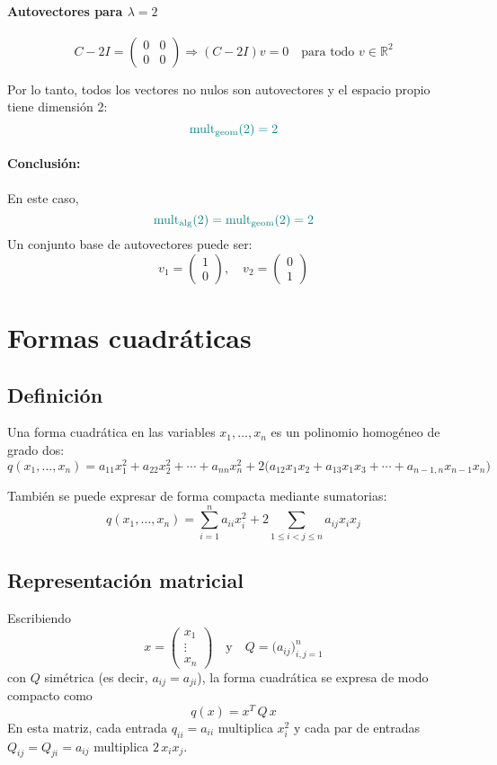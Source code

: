 \documentclass{article}
\begin{document}
\paragraph*{Autovectores para \(\lambda=2\)}

\[
C - 2I = \begin{pmatrix}
0 & 0\\
0 & 0
\end{pmatrix}
\Rightarrow
(C - 2I)v = 0 \quad \text{para todo } v\in\mathbb{R}^2
\]

Por lo tanto, todos los vectores no nulos son autovectores y el espacio propio tiene dimensión 2:
\[
\color{teal}
\mathrm{mult}_{\mathrm{geom}}(2) = 2
\]

\paragraph*{Conclusión:}  
En este caso,
\[
\color{teal}
\mathrm{mult}_{\mathrm{alg}}(2) = \mathrm{mult}_{\mathrm{geom}}(2) = 2
\]
Un conjunto base de autovectores puede ser:
\[
v_1 = \begin{pmatrix}1\\0\end{pmatrix},
\quad
v_2 = \begin{pmatrix}0\\1\end{pmatrix}
\]


\newpage

\section{Formas cuadráticas}



\subsection*{Definición}
Una forma cuadrática en las variables \(x_1,\dots,x_n\) es un polinomio homogéneo de grado dos:
\[
q(x_1,\dots,x_n)
= a_{11}x_1^2 + a_{22}x_2^2 + \cdots + a_{nn}x_n^2
+ 2\bigl(a_{12}x_1x_2 + a_{13}x_1x_3 + \cdots + a_{n-1,n}x_{n-1}x_n\bigr)
\]

También se puede expresar de forma compacta mediante sumatorias:
\[
q(x_1,\dots,x_n)
= \sum_{i=1}^n a_{ii}x_i^2
+ 2\sum_{1\le i<j\le n} a_{ij}x_i x_j
\]
\subsection*{Representación matricial}
Escribiendo
\[
x = \begin{pmatrix}x_1\\ \vdots\\ x_n\end{pmatrix}
\quad\text{y}\quad
Q = \bigl(a_{ij}\bigr)_{i,j=1}^n
\]
con \(Q\) simétrica (es decir, \(a_{ij}=a_{ji}\)), la forma cuadrática se expresa de modo compacto como
\[
q(x) = x^T\,Q\,x
\]
En esta matriz, cada entrada \(q_{ii}=a_{ii}\) multiplica \(x_i^2\) y cada par de entradas \(Q_{ij}=Q_{ji}=a_{ij}\) multiplica \(2\,x_i x_j\).
\end{document}
